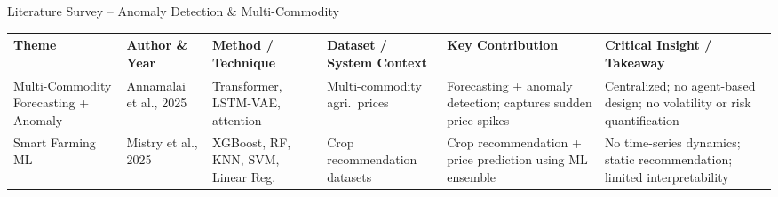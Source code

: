 \documentclass{beamer}
\begin{document}
\begin{frame}[label=lit_anom]{Literature Survey -- Anomaly Detection \& Multi-Commodity}
\setlength{\tabcolsep}{2pt}
\renewcommand{\arraystretch}{1.3}
\tiny

\begin{tcolorbox}[enhanced, colback=white, colframe=accentgreen!40, arc=4pt, boxrule=0.3pt,
  left=1pt, right=1pt, top=2pt, bottom=2pt, shadow={1pt}{-1pt}{0pt}{black!10}]
\begin{adjustbox}{max width=\textwidth}
\begin{tabular}{|L{1.5cm}|L{1.4cm}|L{1.6cm}|L{1.8cm}|L{2.0cm}|L{2.3cm}|}
\hline
{}
\textbf{Theme} & \textbf{Author \& Year} & \textbf{Method / Technique} & \textbf{Dataset / System Context} & \textbf{Key Contribution} & \textbf{Critical Insight / Takeaway} \\
\hline
Multi-Commodity Forecasting + Anomaly & Annamalai et al., 2025 & Transformer, LSTM-VAE, attention & Multi-commodity agri.\ prices & Forecasting + anomaly detection; captures sudden price spikes & Centralized; no agent-based design; no volatility or risk quantification \\ \hline
Smart Farming ML & Mistry et al., 2025 & XGBoost, RF, KNN, SVM, Linear Reg. & Crop recommendation datasets & Crop recommendation + price prediction using ML ensemble & No time-series dynamics; static recommendation; limited interpretability \\ \hline
\end{tabular}
\end{adjustbox}
\end{tcolorbox}

\end{frame}
\end{document}
